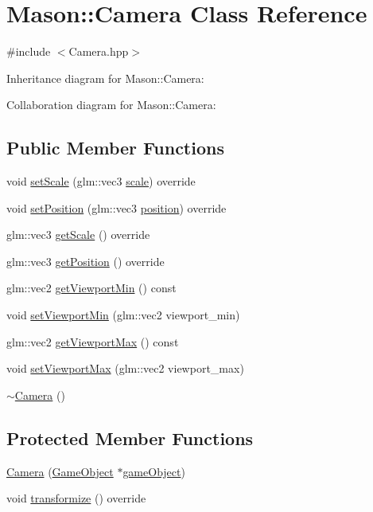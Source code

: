 \hypertarget{class_mason_1_1_camera}{}\section{Mason\+:\+:Camera Class Reference}
\label{class_mason_1_1_camera}


{\ttfamily \#include $<$Camera.\+hpp$>$}



Inheritance diagram for Mason\+:\+:Camera\+:


Collaboration diagram for Mason\+:\+:Camera\+:
\subsection*{Public Member Functions}
\begin{DoxyCompactItemize}
\item 
void \hyperlink{class_mason_1_1_camera_a732501ee31e862f557bbbc8ff58631a4}{set\+Scale} (glm\+::vec3 \hyperlink{class_mason_1_1_transform_a4618b31e34a6ec8a0ee638401fc56367}{scale}) override
\item 
void \hyperlink{class_mason_1_1_camera_a69f184af46d081b85209040bbe814cbb}{set\+Position} (glm\+::vec3 \hyperlink{class_mason_1_1_transform_ac9e11b4ec4433a38ac1100f12c955dcb}{position}) override
\item 
glm\+::vec3 \hyperlink{class_mason_1_1_camera_a405b26eaaae2ab7a460dfc319a9d16ea}{get\+Scale} () override
\item 
glm\+::vec3 \hyperlink{class_mason_1_1_camera_a71560b8b6216a542ae1958bd91a4361d}{get\+Position} () override
\item 
glm\+::vec2 \hyperlink{class_mason_1_1_camera_a0d2d26d8b7b80ab508ed4f4f537614b5}{get\+Viewport\+Min} () const
\item 
void \hyperlink{class_mason_1_1_camera_aa630259d7e0c0124dec5c9aaf33b7160}{set\+Viewport\+Min} (glm\+::vec2 viewport\+\_\+min)
\item 
glm\+::vec2 \hyperlink{class_mason_1_1_camera_abe43550148e85f5a32919a3c8b8ff115}{get\+Viewport\+Max} () const
\item 
void \hyperlink{class_mason_1_1_camera_a1f9a7896bb617d1402e3c4738324e1ea}{set\+Viewport\+Max} (glm\+::vec2 viewport\+\_\+max)
\item 
\hyperlink{class_mason_1_1_camera_ad1897942d0ccf91052386388a497349f}{$\sim$\+Camera} ()
\end{DoxyCompactItemize}
\subsection*{Protected Member Functions}
\begin{DoxyCompactItemize}
\item 
\hyperlink{class_mason_1_1_camera_aca4e1307d4601e7f0a711dfd94729143}{Camera} (\hyperlink{class_mason_1_1_game_object}{Game\+Object} $\ast$\hyperlink{class_mason_1_1_component_a30030370c35f5562cbbbb0927b0448c8}{game\+Object})
\item 
void \hyperlink{class_mason_1_1_camera_a27ff2d3ad004a49db2ae508ac6e9d3c2}{transformize} () override
\end{DoxyCompactItemize}
